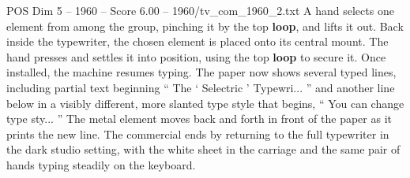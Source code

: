 \begin{textsample}{POS Dim 5 – 1960 – Score 6.00 – 1960/tv\_com\_1960\_2.txt}
A hand selects one element from among the group, pinching it by the top \textbf{loop}, and lifts it out.
Back inside the typewriter, the chosen element is placed onto its central mount.
The hand presses and settles it into position, using the top \textbf{loop} to secure it.
Once installed, the machine resumes typing.
The paper now shows several typed lines, including partial text beginning “ The ‘ Selectric ’ Typewri... ” and another line below in a visibly different, more slanted type style that begins, “ You can change type sty... ” The metal element moves back and forth in front of the paper as it prints the new line.
The commercial ends by returning to the full typewriter in the dark studio setting, with the white sheet in the carriage and the same pair of hands typing steadily on the keyboard.

\end{textsample}
